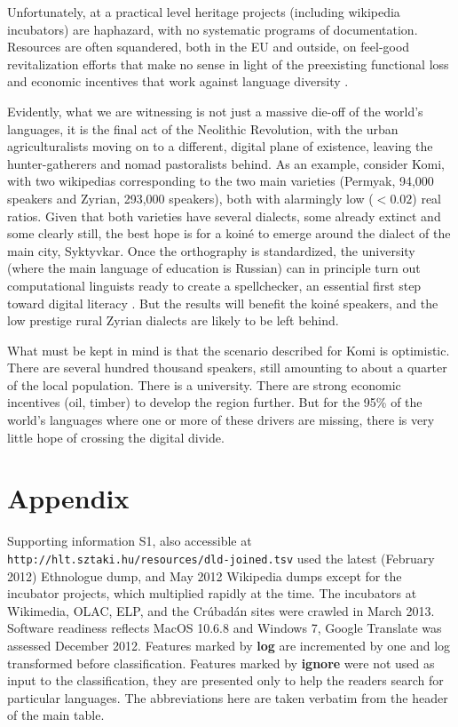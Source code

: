 \documentclass[10pt]{article}
\begin{document}
\noindent
Unfortunately, at a practical level heritage projects (including wikipedia
incubators) are haphazard, with no systematic programs of
documentation. Resources are often squandered, both in the EU and outside, on
feel-good revitalization efforts that make no sense in light of the
preexisting functional loss and economic incentives that work against language
diversity \cite{Ginsburgh:2011}.

Evidently, what we are witnessing is not just a massive die-off of the
world's languages, it is the final act of the Neolithic Revolution, with the
urban agriculturalists moving on to a different, digital plane of existence,
leaving the hunter-gatherers and nomad pastoralists behind. As an example,
consider Komi, with two wikipedias corresponding to the two main varieties
(Permyak, 94,000 speakers and Zyrian, 293,000 speakers), both with alarmingly
low ($< 0.02$) real ratios. Given that both varieties have several dialects,
some already extinct and some clearly {\color{black} still}, the best hope is for a koin\'e to
emerge around the dialect of the main city, Syktyvkar. Once the orthography is
standardized, the university (where the main language of education is Russian)
can in principle turn out computational linguists ready to create a
spellchecker, an essential first step toward digital literacy \cite{Proszeky:2005}.
But the results will benefit the koin\'e speakers, and the
low prestige rural Zyrian dialects are likely to be left behind.

What must be kept in mind is that the scenario described for Komi is
optimistic. There are several hundred thousand speakers, still amounting to
about a quarter of the local population. There is a university. There are
strong economic incentives (oil, timber) to develop the region further. But
for the 95\% of the world's languages where one or more of these drivers are
missing, there is very little hope of crossing the digital divide.

\section*{Appendix}

Supporting information S1, also accessible at {\tt
  http://hlt.sztaki.hu/resources/dld-joined.tsv} used the latest (February
2012) Ethnologue dump, and May 2012 Wikipedia dumps except for the incubator
projects, which multiplied rapidly at the time. The incubators at Wikimedia,
OLAC, ELP, and the Cr\'ubad\'an sites were crawled in March 2013.  Software
readiness reflects MacOS 10.6.8 and Windows 7, Google Translate was assessed
December 2012. Features marked by {\bf log} are incremented by one and log
transformed before classification. Features marked by {\bf ignore} were not
used as input to the classification, they are presented only to help the
readers search for particular languages. The abbreviations here are taken
verbatim from the header of the main table.
\end{document}
